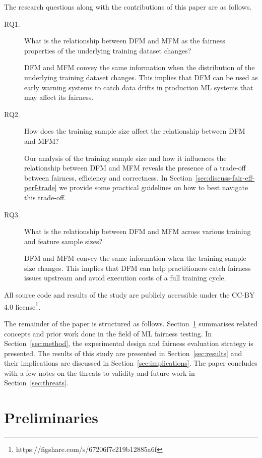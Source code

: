 \documentclass[conference,review,anonymous]{IEEEtran}
\begin{document}
The research questions along with the contributions of this paper are
as follows.
\begin{description}
  \item[RQ1.] What is the relationship between DFM and MFM as the
    fairness properties of the underlying training dataset changes?

    DFM and MFM convey the same information when the distribution of
    the underlying training dataset changes. This implies that DFM can
    be used as early warning systems to catch data drifts in
    production ML systems that may affect its fairness.

  \item[RQ2.] How does the training sample size affect the
    relationship between DFM and MFM?

    Our analysis of the training sample size and how it influences the
    relationship between DFM and MFM reveals the presence of a
    trade-off between fairness, efficiency and correctness. In
    Section \ref{sec:discuss-fair-eff-perf-trade} we provide some
    practical guidelines on how to best navigate this trade-off.

  \item[RQ3.] What is the relationship between DFM and MFM across
    various training and feature sample sizes?

    DFM and MFM convey the same information when the training sample
    size changes. This implies that DFM can help practitioners catch
    fairness issues upstream and avoid execution costs of a full
    training cycle.
\end{description}

All source code and results of the study are publicly accessible under
the CC-BY 4.0
license\footnote{https://figshare.com/s/67206f7c219b12885a6f}.

The remainder of the paper is structured as follows.
Section \ref{sec:related} summarises related concepts and prior work
done in the field of ML fairness testing. In Section \ref{sec:method},
the experimental design and fairness evaluation strategy is presented.
The results of this study are presented in Section \ref{sec:results}
and their implications are discussed in
Section \ref{sec:implications}. The paper concludes with a few notes
on the threats to validity and future work in
Section \ref{sec:threats}.

\section{Preliminaries}\label{sec:related}
\end{document}
